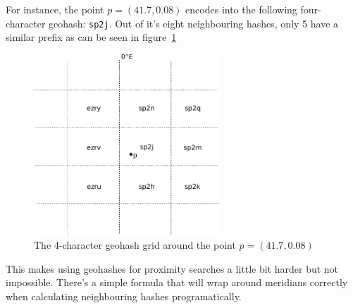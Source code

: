 \documentclass[a4paper,11pt,oneside]{scrartcl}
\begin{document}
For instance, the point $p = (41.7, 0.08)$ encodes into the following four-character geohash: \texttt{sp2j}.
Out of it's eight neighbouring hashes, only 5 have a similar prefix as can be seen in figure~\ref{fig:4-grid}

\begin{figure}[t]
	\centering
	\includegraphics[width=7cm]{graphics/grid_meridian.pdf}
	\caption{The 4-character geohash grid around the point $p = (41.7, 0.08)$}
	\label{fig:4-grid}
\end{figure}

This makes using geohashes for proximity searches a little bit harder but not impossible. There's a simple formula that will wrap around meridians correctly when calculating neighbouring hashes programatically.
\end{document}
